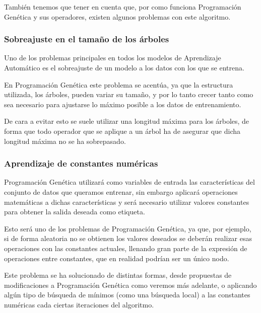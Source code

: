 También tenemos que tener en cuenta que, por como funciona Programación Genética y sus operadores, existen algunos problemas con este algoritmo.

\subsubsection{Sobreajuste en el tamaño de los árboles}

Uno de los problemas principales en todos los modelos de Aprendizaje Automático es el sobreajuste de un modelo a los datos con los que se entrena.

En Programación Genética este problema se acentúa, ya que la estructura utilizada, los árboles, pueden variar su tamaño, y por lo tanto crecer tanto como sea necesario para ajustarse lo máximo posible a los datos de entrenamiento.

De cara a evitar esto se suele utilizar una longitud máxima para los árboles, de forma que todo operador que se aplique a un árbol ha de asegurar que dicha longitud máxima no se ha sobrepasado.

\subsubsection{Aprendizaje de constantes numéricas}

Programación Genética utilizará como variables de entrada las características del conjunto de datos que queramos entrenar, sin embargo aplicará operaciones matemáticas a dichas características y será necesario utilizar valores constantes para obtener la salida deseada como etiqueta.

Esto será uno de los problemas de Programación Genética, ya que, por ejemplo, si de forma aleatoria no se obtienen los valores deseados se deberán realizar esas operaciones con las constantes actuales, llenando gran parte de la expresión de operaciones entre constantes, que en realidad podrían ser un único nodo.

Este problema se ha solucionado de distintas formas, desde propuestas de modificaciones a Programación Genética como veremos más adelante, o aplicando algún tipo de búsqueda de mínimos (como una búsqueda local) a las constantes numéricas cada ciertas iteraciones del algoritmo.


\newpage
